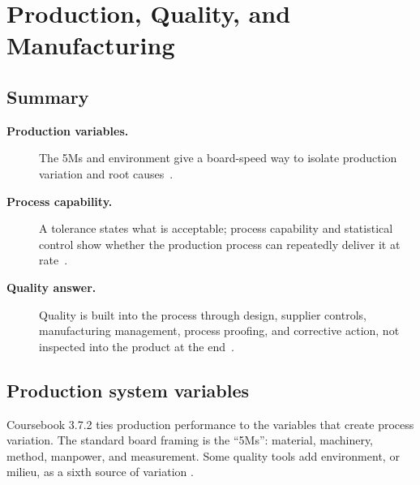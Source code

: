\documentclass[../main.tex]{subfiles}
\begin{document}

\section{Production, Quality, and Manufacturing}

\subsection{Summary}
\begin{description}
  \item[\textbf{Production variables.}] The 5Ms and environment give a board-speed way to isolate production variation and root causes~\autocite{edo-3-7-2-production-quality-manufacturing-2026}.
  \item[\textbf{Process capability.}] A tolerance states what is acceptable; process capability and statistical control show whether the production process can repeatedly deliver it at rate~\autocite{edo-3-7-2-production-quality-manufacturing-2026,DoD-Producibility-Manufacturability-Guide-2024}.
  \item[\textbf{Quality answer.}] Quality is built into the process through design, supplier controls, manufacturing management, process proofing, and corrective action, not inspected into the product at the end~\autocite{edo-3-7-2-production-quality-manufacturing-2026,DAU-Manufacturing-Quality}.
\end{description}

\subsection{Production system variables}

Coursebook 3.7.2 ties production performance to the variables that create
process variation.  The standard board framing is the ``5Ms'': material,
machinery, method, manpower, and measurement.  Some quality tools add
environment, or milieu, as a sixth source of variation
\autocite{edo-3-7-2-production-quality-manufacturing-2026}.
\end{document}
